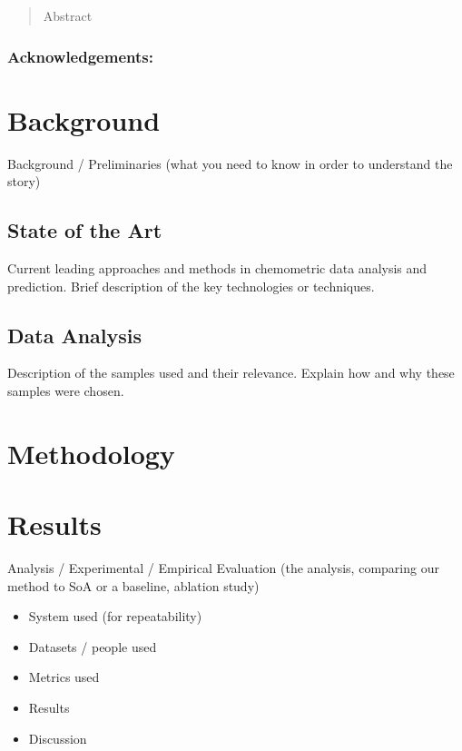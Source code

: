 
\newpage

\begin{abstract}
Abstract
\end{abstract}

\maketitle

\subsubsection*{Acknowledgements:}




\section{Background}
Background / Preliminaries (what you need to know in order to understand the story)
\subsection{State of the Art}
Current leading approaches and methods in chemometric data analysis and prediction.
Brief description of the key technologies or techniques.



\subsection{Data Analysis}
Description of the samples used and their relevance.
Explain how and why these samples were chosen.

\section{Methodology}


\section{Results}
Analysis / Experimental / Empirical Evaluation (the analysis, comparing our method to SoA or a baseline, ablation study)
\begin{itemize}
    \item System used (for repeatability)
    \item Datasets / people used
    \item Metrics used
    \item Results
    \item Discussion
\end{itemize}

